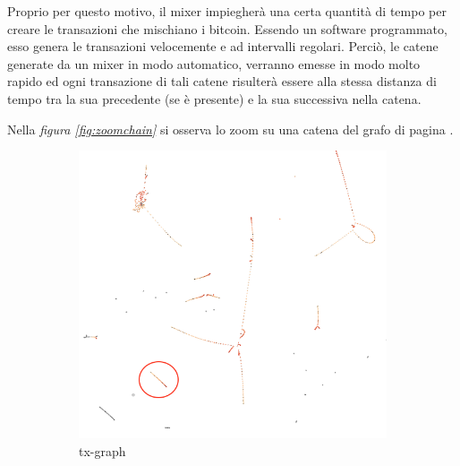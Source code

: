 Proprio per questo motivo, il mixer impiegherà una certa quantità di tempo per creare le transazioni che mischiano i bitcoin. Essendo un software programmato, esso genera le transazioni velocemente e ad intervalli regolari. Perciò, le catene generate da un mixer in modo automatico, verranno emesse in modo molto rapido ed ogni transazione di tali catene risulterà essere alla stessa distanza di tempo tra la sua precedente (se è presente) e la sua successiva nella catena.

Nella \textit{figura \ref{fig:zoomchain}} si osserva lo zoom su una catena del grafo di pagina \pageref*{fig:txgraph}.

\begin{figure}[htbp]
	\centering
	\begin{subfigure}[b]{0.4\textwidth}
		\includegraphics[width=\textwidth]{figure/zoomchain1}
		\caption{tx-graph}
		\label{fig:zoomchain1}
	\end{subfigure}\quad \qquad
	\begin{subfigure}[b]{0.4 \textwidth}

\end{subfigure}
\end{figure}
